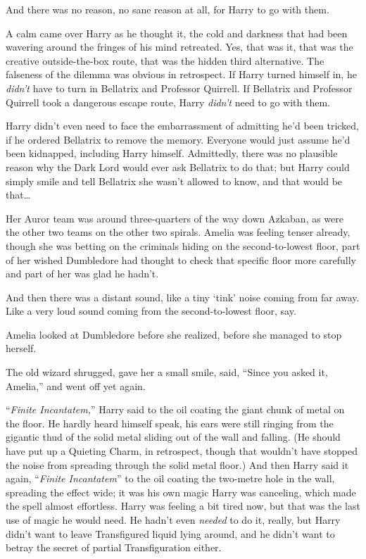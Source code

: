 And there was no reason, no sane reason at all, for Harry to go with them.

A calm came over Harry as he thought it, the cold and darkness that had been wavering around the fringes of his mind retreated. Yes, that was it, that was the creative outside-the-box route, that was the hidden third alternative. The falseness of the dilemma was obvious in retrospect. If Harry turned himself in, he \emph{didn’t} have to turn in Bellatrix and Professor Quirrell. If Bellatrix and Professor Quirrell took a dangerous escape route, Harry \emph{didn’t} need to go with them.

Harry didn’t even need to face the embarrassment of admitting he’d been tricked, if he ordered Bellatrix to remove the memory. Everyone would just assume he’d been kidnapped, including Harry himself. Admittedly, there was no plausible reason why the Dark Lord would ever ask Bellatrix to do that; but Harry could simply smile and tell Bellatrix she wasn’t allowed to know, and that would be that…

\later

Her Auror team was around three-quarters of the way down Azkaban, as were the other two teams on the other two spirals. Amelia was feeling tenser already, though she was betting on the criminals hiding on the second-to-lowest floor, part of her wished Dumbledore had thought to check that specific floor more carefully and part of her was glad he hadn’t.

And then there was a distant sound, like a tiny ‘tink’ noise coming from far away. Like a very loud sound coming from the second-to-lowest floor, say.

Amelia looked at Dumbledore before she realized, before she managed to stop herself.

The old wizard shrugged, gave her a small smile, said, “Since you asked it, Amelia,” and went off yet again.

\later

“\emph{Finite Incantatem,}” Harry said to the oil coating the giant chunk of metal on the floor. He hardly heard himself speak, his ears were still ringing from the gigantic thud of the solid metal sliding out of the wall and falling. (He should have put up a Quieting Charm, in retrospect, though that wouldn’t have stopped the noise from spreading through the solid metal floor.) And then Harry said it again, “\emph{Finite Incantatem}” to the oil coating the two-metre hole in the wall, spreading the effect wide; it was his own magic Harry was canceling, which made the spell almost effortless. Harry was feeling a bit tired now, but that was the last use of magic he would need. He hadn’t even \emph{needed} to do it, really, but Harry didn’t want to leave Transfigured liquid lying around, and he didn’t want to betray the secret of partial Transfiguration either.

